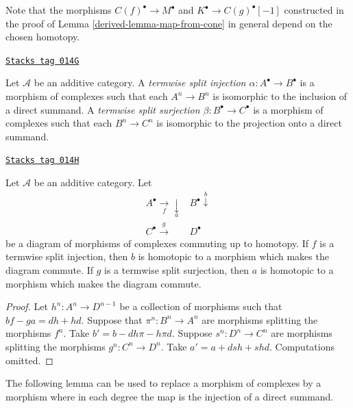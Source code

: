 Note that the morphisms $C(f)^\bullet \to M^\bullet$ and
$K^\bullet \to C(g)^\bullet[-1]$ constructed in the proof
of Lemma \ref{derived-lemma-map-from-cone} in general depend on the
chosen homotopy.

\begin{definition}
\label{derived-definition-termwise-split-map}
\href{https://stacks.math.columbia.edu/tag/014G}{\texttt{Stacks tag 014G}}

Let $\mathcal{A}$ be an additive category.
A {\it termwise split injection $\alpha : A^\bullet \to B^\bullet$}
is a morphism of complexes such that each $A^n \to B^n$
is isomorphic to the inclusion of a direct summand.
A {\it termwise split surjection $\beta : B^\bullet \to C^\bullet$}
is a morphism of complexes such that each $B^n \to C^n$
is isomorphic to the projection onto a direct summand.
\end{definition}

\begin{lemma}
\label{derived-lemma-make-commute-map}
\href{https://stacks.math.columbia.edu/tag/014H}{\texttt{Stacks tag 014H}}

Let $\mathcal{A}$ be an additive category.
Let
$$
\begin{array}{cc}A^\bullet \underset{f}{\longrightarrow}\underset{a}{\downarrow} & B^\bullet \overset{b}{\downarrow} \\ C^\bullet \overset{g}{\longrightarrow} & D^\bullet\end{array}
$$
be a diagram of morphisms of complexes commuting up to homotopy.
If $f$ is a termwise split injection, then $b$ is homotopic to a
morphism which makes the diagram commute.
If $g$ is a termwise split surjection, then $a$ is homotopic to a
morphism which makes the diagram commute.
\end{lemma}

\begin{proof}
Let $h^n : A^n \to D^{n - 1}$ be a collection of morphisms
such that $bf - ga = dh + hd$. Suppose that $\pi^n : B^n \to A^n$
are morphisms splitting the morphisms $f^n$.
Take $b' = b - dh\pi - h\pi d$.
Suppose $s^n : D^n \to C^n$ are morphisms splitting the morphisms
$g^n : C^n \to D^n$. Take $a' = a + dsh + shd$.
Computations omitted.
\end{proof}

The following lemma can be used to replace a morphism of complexes
by a morphism where in each degree the map is the injection of a
direct summand.

